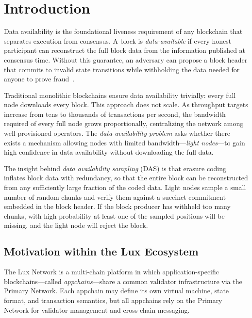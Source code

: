 \section{Introduction}

\label{sec:introduction}

Data availability is the foundational liveness requirement of any blockchain that separates
execution from consensus. A block is \emph{data-available} if every honest participant can
reconstruct the full block data from the information published at consensus time. Without
this guarantee, an adversary can propose a block header that commits to invalid state
transitions while withholding the data needed for anyone to prove fraud~\cite{albassam2018fraud}.

Traditional monolithic blockchains ensure data availability trivially: every full node
downloads every block. This approach does not scale. As throughput targets increase from
tens to thousands of transactions per second, the bandwidth required of every full node
grows proportionally, centralizing the network among well-provisioned operators. The
\emph{data availability problem} asks whether there exists a mechanism allowing nodes with
limited bandwidth---\emph{light nodes}---to gain high confidence in data availability without
downloading the full data.

The insight behind \emph{data availability sampling} (DAS) is that erasure coding inflates
block data with redundancy, so that the entire block can be reconstructed from any sufficiently
large fraction of the coded data. Light nodes sample a small number of random chunks and
verify them against a succinct commitment embedded in the block header. If the block producer
has withheld too many chunks, with high probability at least one of the sampled positions
will be missing, and the light node will reject the block.

\subsection{Motivation within the Lux Ecosystem}

The Lux Network is a multi-chain platform in which application-specific blockchains---called
\emph{appchains}---share a common validator infrastructure via the Primary Network. Each appchain
may define its own virtual machine, state format, and transaction semantics, but all appchains
rely on the Primary Network for validator management and cross-chain messaging.

